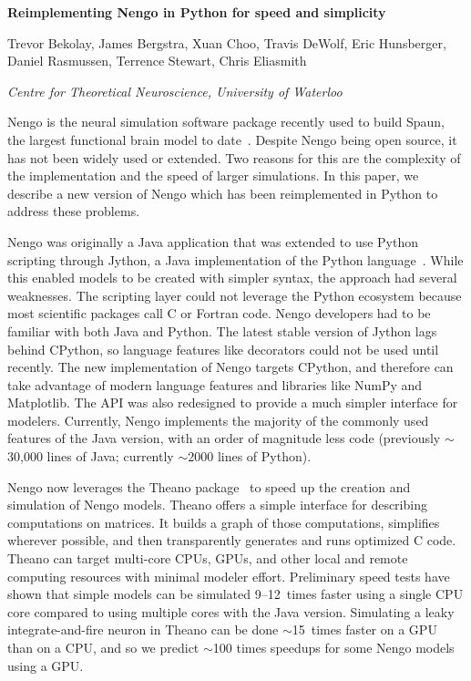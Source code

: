 \documentclass[12pt]{article}
\begin{document}
\thispagestyle{empty} %

\begin{centering}
{\large \bf Reimplementing Nengo in Python for speed and simplicity}

\vspace{12pt}
{Trevor Bekolay, James Bergstra, Xuan Choo, Travis DeWolf,
Eric Hunsberger, \\ Daniel Rasmussen, Terrence Stewart, Chris Eliasmith}

{\it Centre for Theoretical Neuroscience, University of Waterloo}

\vspace{12pt}
\end{centering}

  Nengo is the neural simulation software package
  recently used to build Spaun,
  the largest functional brain model to date~\cite{spaun}.
  Despite Nengo being open source, it has not been
  widely used or extended. Two reasons
  for this are the complexity of
  the implementation and the speed of larger simulations.
  In this paper, we describe a new version of Nengo
  which has been reimplemented in Python to
  address these problems.

  Nengo was originally a Java application that
  was extended to use Python scripting through Jython,
  a Java implementation of the Python language~\cite{nengo}.
  While this enabled models to be created
  with simpler syntax, 
  the approach had several weaknesses.
  The scripting layer
  could not leverage the Python ecosystem
  because most scientific packages call C or Fortran code.
  Nengo developers had to be familiar with both Java and Python.
  The latest stable version of Jython
  lags behind CPython, so language features like
  decorators could not be used until recently.
  The new implementation of Nengo targets CPython,
  and therefore can take advantage of modern language features
  and libraries like NumPy and Matplotlib.
  The API was also redesigned to provide
  a much simpler interface for modelers.
  Currently, Nengo implements the majority
  of the commonly used features of the Java version,
  with an order of magnitude less code
  (previously $\sim$30,000 lines of Java;
  currently $\sim$2000 lines of Python).

  Nengo now leverages the Theano package~\cite{theano}
  to speed up the creation and simulation of
  Nengo models.
  Theano offers a simple interface for
  describing computations on matrices.
  It builds a graph of those computations,
  simplifies wherever possible, and then transparently
  generates and runs optimized C code.
  Theano can target multi-core CPUs, GPUs,
  and other local and remote computing resources
  with minimal modeler effort.
  Preliminary speed tests have shown that simple models
  can be simulated 9--12~times faster
  using a single CPU core compared to using multiple cores
  with the Java version.
  Simulating a leaky integrate-and-fire neuron in Theano
  can be done $\sim$15~times faster on a GPU than
  on a CPU, and so we predict $\sim$100 times speedups
  for some Nengo models using a GPU.
\end{document}
